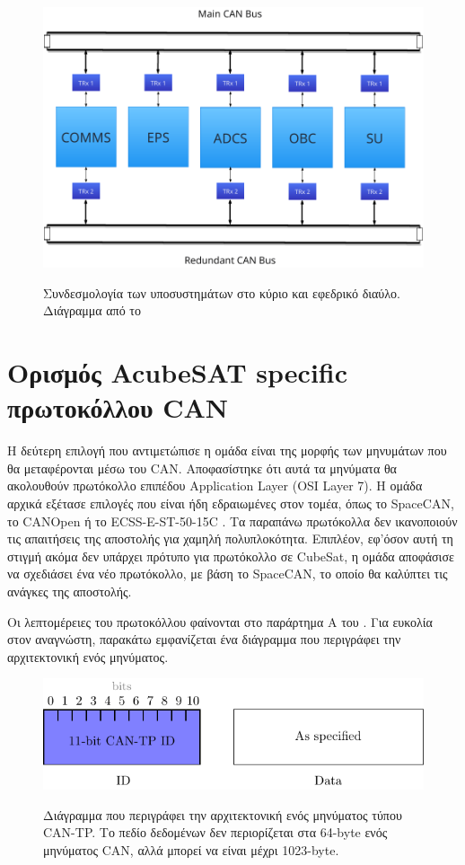 \documentclass[a4paper,nobib,justified]{tufte-book}
\begin{document}
\begin{figure}[h]
	\includegraphics[width=0.8\linewidth]{media/diagrams/subsystems-on-buses.pdf}
	\label{fig:dual-buses}
	\caption[Συνδεσμολογία των υποσυστημάτων στους διαύλους]{Συνδεσμολογία των υποσυστημάτων στο κύριο και εφεδρικό διαύλο. Διάγραμμα από το \cite{DDJF_OBDH}}
\end{figure}

\section{Ορισμός AcubeSAT specific πρωτοκόλλου CAN}
Η δεύτερη επιλογή που αντιμετώπισε η ομάδα είναι της μορφής των μηνυμάτων που θα μεταφέρονται μέσω του CAN. Αποφασίστηκε ότι αυτά τα μηνύματα θα ακολουθούν πρωτόκολλο επιπέδου Application Layer (OSI Layer 7). Η ομάδα αρχικά εξέτασε επιλογές που είναι ήδη εδραιωμένες στον τομέα, όπως το SpaceCAN, το CANOpen ή το ECSS-E-ST-50-15C . Τα παραπάνω πρωτόκολλα δεν ικανοποιούν τις απαιτήσεις της αποστολής για χαμηλή πολυπλοκότητα. Επιπλέον, εφ'όσον αυτή τη στιγμή ακόμα δεν υπάρχει πρότυπο για πρωτόκολλο σε CubeSat, η ομάδα αποφάσισε να σχεδιάσει ένα νέο πρωτόκολλο, με βάση το SpaceCAN, το οποίο θα καλύπτει τις ανάγκες της αποστολής.

Οι λεπτομέρειες του πρωτοκόλλου φαίνονται στο παράρτημα Α του . Για ευκολία στον αναγνώστη, παρακάτω εμφανίζεται ένα διάγραμμα που περιγράφει την αρχιτεκτονική ενός μηνύματος.

\begin{figure}[h]
	\includegraphics[width=0.6\linewidth]{media/diagrams/tp-message-structure.pdf}
	\label{fig:tp-message-structure}
	\caption[Αρχιτεκτονική ενός μηνύματος τύπου CAN-TP.]{Διάγραμμα που περιγράφει την αρχιτεκτονική ενός μηνύματος τύπου CAN-TP. Το πεδίο δεδομένων δεν περιορίζεται στα 64-byte ενός μηνύματος CAN, αλλά μπορεί να είναι μέχρι 1023-byte.}
\end{figure}
\FloatBarrier
\end{document}
